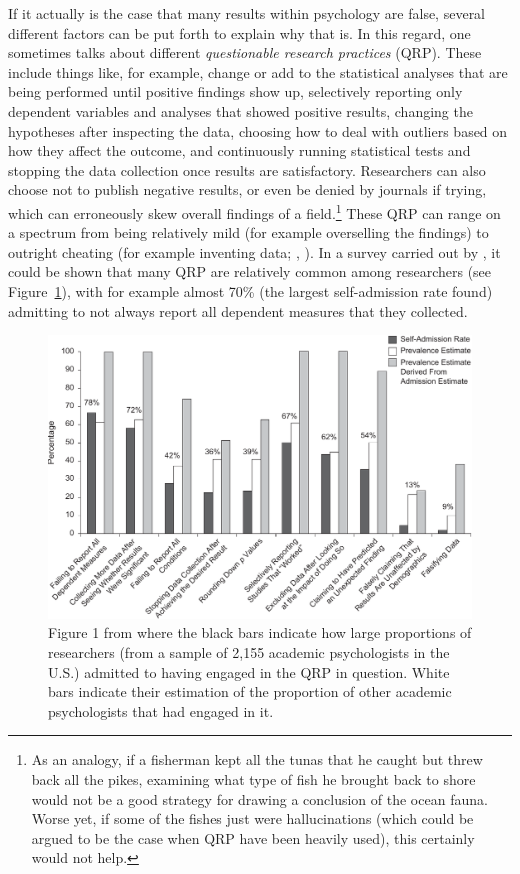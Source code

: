 If it actually is the case that many results within psychology are false, several different factors can be put forth to explain why that is. In this regard, one sometimes talks about different \emph{questionable research practices} (QRP). These include things like, for example, change or add to the statistical analyses that are being performed until positive findings show up, selectively reporting only dependent variables and analyses that showed positive results, changing the hypotheses after inspecting the data, choosing how to deal with outliers based on how they affect the outcome, and continuously running statistical tests and stopping the data collection once results are satisfactory. Researchers can also choose not to publish negative results, or even be denied by journals if trying, which can erroneously skew overall findings of a field.\footnote{As an analogy, if a fisherman kept all the tunas that he caught but threw back all the pikes, examining what type of fish he brought back to shore would not be a good strategy for drawing a conclusion of the ocean fauna. Worse yet, if some of the fishes just were hallucinations (which could be argued to be the case when QRP have been heavily used), this certainly would not help.} These QRP can range on a spectrum from being relatively mild (for example overselling the findings) to outright cheating (for example inventing data; \citeauthor{Neuroskeptic2012}, \citeyear{Neuroskeptic2012}). In a survey carried out by \textcite{John2012}, it could be shown that many QRP are relatively common among researchers (see Figure \ref{Figure:John2012_Figure1}), with for example almost 70\% (the largest self-admission rate found) admitting to not always report all dependent measures that they collected.

\begin{figure} \centering \includegraphics[width=120mm]{./Figures/John2012_Figure1.pdf} \caption{Figure 1 from \textcite{John2012} where the black bars indicate how large proportions of researchers (from a sample of 2,155 academic psychologists in the U.S.) admitted to having engaged in the QRP in question. White bars indicate their estimation of the proportion of other academic psychologists that had engaged in it.} \label{Figure:John2012_Figure1} \end{figure}

